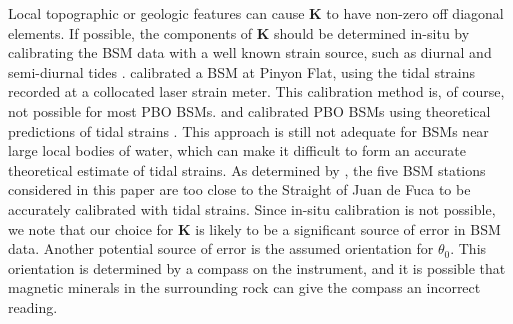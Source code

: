 Local topographic or geologic features can cause $\mathbf{K}$ to have
non-zero off diagonal elements. If possible, the components of
$\mathbf{K}$ should be determined in-situ by calibrating the BSM data
with a well known strain source, such as diurnal and semi-diurnal
tides \citep{Hart1996,Roeloffs2010,Hodgkinson2013}. \citet{Hart1996}
calibrated a BSM at Pinyon Flat, using the tidal strains recorded at a
collocated laser strain meter. This calibration method is, of course,
not possible for most PBO BSMs. \citet{Roeloffs2010} and
\citet{Hodgkinson2013} calibrated PBO BSMs using theoretical
predictions of tidal strains \citep[e.g.,][]{Agnew1997}. This approach
is still not adequate for BSMs near large local bodies of water, which
can make it difficult to form an accurate theoretical estimate of
tidal strains. As determined by \citet{Roeloffs2010}, the five BSM
stations considered in this paper are too close to the Straight of
Juan de Fuca to be accurately calibrated with tidal strains. Since
in-situ calibration is not possible, we note that our choice for
$\mathbf{K}$ is likely to be a significant source of error in BSM
data. Another potential source of error is the assumed orientation for
$\theta_0$. This orientation is determined by a compass on the
instrument, and it is possible that magnetic minerals in the
surrounding rock can give the compass an incorrect reading.

